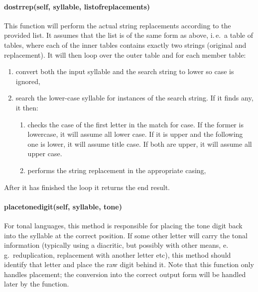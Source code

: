 \documentclass{ltxdockit}
\begin{document}
\paragraph{do\textunderscore{}str\textunderscore{}rep(self, syllable,
list\textunderscore{}of\textunderscore{}replacements)}

This function will perform the actual string replacements according to the
provided list. It assumes that the list is of the same form as
 above, i.\,e.\ a table of tables, where each
of the inner tables contains exactly two strings (original and replacement). It
will then loop over the outer table and for each member table:

\begin{enumerate}
  \item convert both the input syllable and the search string to lower so case
    is ignored,
  \item search the lower-case syllable for instances of the search string. If it
    finds any, it then:
    \begin{enumerate}
      \item checks the case of the first letter in the match for case. If the
        former is lowercase, it will assume all lower case.  If it is upper and
        the following one is lower, it will assume title case. If both are
        upper, it will assume all upper case.
      \item performs the string replacement in the appropriate casing,
    \end{enumerate}
\end{enumerate}

After it has finished the loop it returns the end result.

\paragraph{place\textunderscore{}tone\textunderscore{}digit(self, syllable,
tone)}

For tonal languages, this method is responsible for placing the tone digit back
into the syllable at the correct position. If some other letter will carry the
tonal information (typically using a diacritic, but possibly with other means,
e.\,g.\ reduplication, replacement with another letter etc), this method should
identify that letter and place the raw digit behind it. Note that this function
only handles placement; the conversion into the correct output form will be
handled later by the 
function.
\end{document}
